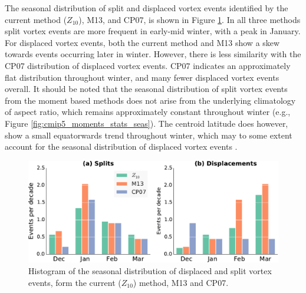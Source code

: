 

The seasonal distribution of split and displaced vortex events identified by the
current method ($Z_{10}$), M13, and CP07, is shown in Figure
\ref{fig:z_m13_cp07_histogram}. In all three methods split vortex events are
more frequent in early-mid winter, with a peak in January. For displaced vortex
events, both the current method and M13 show a skew towards events occurring
later in winter. However, there is less similarity with the CP07 distribution of
displaced vortex events. CP07 indicates an approximately flat distribution
throughout winter, and many fewer displaced vortex events overall. It should be
noted that the seasonal distribution of split vortex events from the moment
based methods does not arise from the underlying climatology of aspect ratio,
which remains approximately constant throughout winter (e.g., Figure
\ref{fig:cmip5_moments_stats_seas}). The centroid latitude does however, show a
small equatorwards trend throughout winter, which may to some extent account for
the seasonal distribution of displaced vortex events \citep{Mitchell2011}.

\begin{figure}
  \centering
  \noindent\includegraphics[width=\textwidth]{figures/chapter-moments/splits_displacements_histogram.pdf}
  \caption[Seasonal distribution of displaced and split vortex
  events.]{Histogram of the seasonal distribution of displaced and split vortex
    events, form the current ($Z_{10}$) method, M13 and CP07.}
  \label{fig:z_m13_cp07_histogram}
\end{figure}

